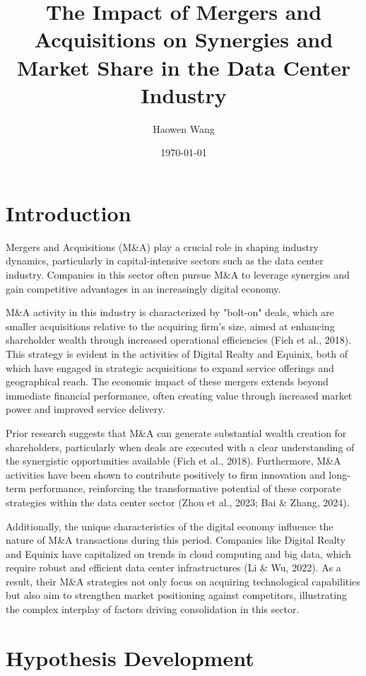 \documentclass{article}
\title{The Impact of Mergers and Acquisitions on Synergies and Market Share in the Data Center Industry}
\author{Haowen Wang}
\date{\today}
\begin{document}
\maketitle

\section{Introduction}

Mergers and Acquisitions (M\&A) play a crucial role in shaping industry dynamics, particularly in capital-intensive sectors such as the data center industry. Companies in this sector often pursue M\&A to leverage synergies and gain competitive advantages in an increasingly digital economy. 

M\&A activity in this industry is characterized by "bolt-on" deals, which are smaller acquisitions relative to the acquiring firm's size, aimed at enhancing shareholder wealth through increased operational efficiencies (Fich et al., 2018). This strategy is evident in the activities of Digital Realty and Equinix, both of which have engaged in strategic acquisitions to expand service offerings and geographical reach. The economic impact of these mergers extends beyond immediate financial performance, often creating value through increased market power and improved service delivery.

Prior research suggests that M\&A can generate substantial wealth creation for shareholders, particularly when deals are executed with a clear understanding of the synergistic opportunities available (Fich et al., 2018). Furthermore, M\&A activities have been shown to contribute positively to firm innovation and long-term performance, reinforcing the transformative potential of these corporate strategies within the data center sector (Zhou et al., 2023; Bai \& Zhang, 2024). 

Additionally, the unique characteristics of the digital economy influence the nature of M\&A transactions during this period. Companies like Digital Realty and Equinix have capitalized on trends in cloud computing and big data, which require robust and efficient data center infrastructures (Li \& Wu, 2022). As a result, their M\&A strategies not only focus on acquiring technological capabilities but also aim to strengthen market positioning against competitors, illustrating the complex interplay of factors driving consolidation in this sector.

\section{Hypothesis Development}
\end{document}
